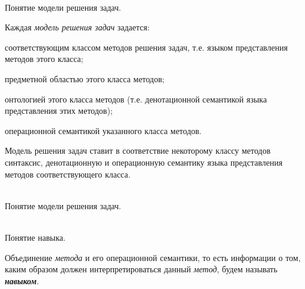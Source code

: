 \begin{frame}{\\Понятие модели решения задач.}
	\topline
	\justifying
    \vspace{0.33cm}
    
    Каждая \textit{модель решения задач} задается:
    \begin{textitemize}
    	\item соответствующим классом методов решения задач, т.е. языком представления методов этого класса;
    	\item предметной областью этого класса методов; 
    	\item онтологией этого класса методов (т.е. денотационной семантикой языка представления этих методов);
    	\item операционной семантикой указанного класса методов.
    \end{textitemize}
    Модель решения задач ставит в соответствие некоторому классу методов синтаксис, денотационную и операционную семантику языка представления методов соответствующего класса.
\end{frame}

\begin{frame}{\\Понятие модели решения задач.}
	\topline
	\justifying
    \begin{SCn}
    \end{SCn}
\end{frame}

\begin{frame}{\\Понятие навыка.}
	\topline
	\justifying
    \begin{SCn}
    Объединение \textit{метода} и его операционной семантики, то есть информации о том, каким образом должен интерпретироваться данный \textit{метод}, будем называть \textbf{\textit{навыком}}.
    \end{SCn}
\end{frame}

